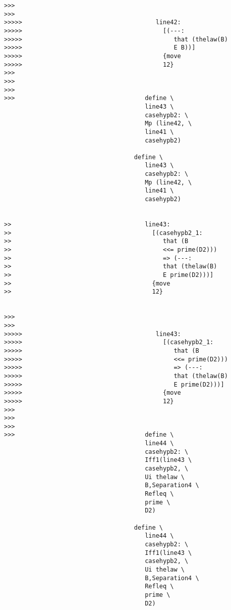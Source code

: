 \documentclass[12pt]{article}
\begin{document}
\begin{verbatim}
>>>
>>>
>>>>>                                     line42:
>>>>>                                       [(---:
>>>>>                                          that (thelaw(B)
>>>>>                                          E B))]
>>>>>                                       {move
>>>>>                                       12}
>>>
>>>
>>>
>>>                                    define \
                                       line43 \
                                       casehypb2: \
                                       Mp (line42, \
                                       line41 \
                                       casehypb2)

                                    define \
                                       line43 \
                                       casehypb2: \
                                       Mp (line42, \
                                       line41 \
                                       casehypb2)


>>                                     line43:
>>                                       [(casehypb2_1:
>>                                          that (B
>>                                          <<= prime(D2)))
>>                                          => (---:
>>                                          that (thelaw(B)
>>                                          E prime(D2)))]
>>                                       {move
>>                                       12}


>>>
>>>
>>>>>                                     line43:
>>>>>                                       [(casehypb2_1:
>>>>>                                          that (B
>>>>>                                          <<= prime(D2)))
>>>>>                                          => (---:
>>>>>                                          that (thelaw(B)
>>>>>                                          E prime(D2)))]
>>>>>                                       {move
>>>>>                                       12}
>>>
>>>
>>>
>>>                                    define \
                                       line44 \
                                       casehypb2: \
                                       Iff1(line43 \
                                       casehypb2, \
                                       Ui thelaw \
                                       B,Separation4 \
                                       Refleq \
                                       prime \
                                       D2)

                                    define \
                                       line44 \
                                       casehypb2: \
                                       Iff1(line43 \
                                       casehypb2, \
                                       Ui thelaw \
                                       B,Separation4 \
                                       Refleq \
                                       prime \
                                       D2)



\end{verbatim}
\end{document}
